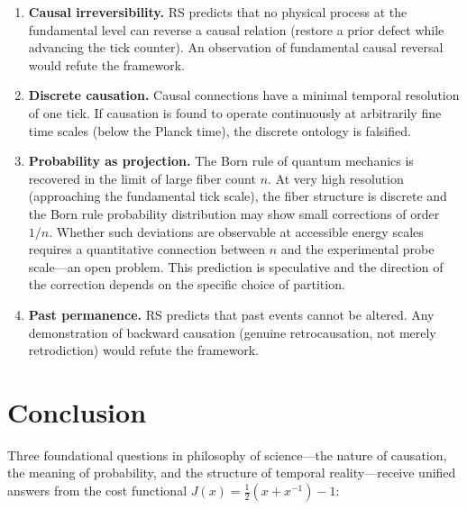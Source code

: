 \documentclass[12pt,a4paper]{article}
\theoremstyle{definition}
\theoremstyle{remark}
\begin{document}
\begin{enumerate}
  \item \textbf{Causal irreversibility.}  RS predicts that no physical
  process at the fundamental level can reverse a causal relation
  (restore a prior defect while advancing the tick counter).  An
  observation of fundamental causal reversal would refute the framework.

  \item \textbf{Discrete causation.}  Causal connections have a minimal
  temporal resolution of one tick.  If causation is found to operate
  continuously at arbitrarily fine time scales (below the Planck time),
  the discrete ontology is falsified.

  \item \textbf{Probability as projection.}  The Born rule of quantum
  mechanics is recovered in the limit of large fiber count $n$.  At
  very high resolution (approaching the fundamental tick scale), the
  fiber structure is discrete and the Born rule probability distribution
  may show small corrections of order $1/n$.  Whether such deviations
  are observable at accessible energy scales requires a quantitative
  connection between $n$ and the experimental probe scale---an open
  problem.  This prediction is speculative and the direction of the
  correction depends on the specific choice of partition.

  \item \textbf{Past permanence.}  RS predicts that past events cannot
  be altered.  Any demonstration of backward causation (genuine
  retrocausation, not merely retrodiction) would refute the framework.
\end{enumerate}

\section{Conclusion}
\label{sec:conclusion}

Three foundational questions in philosophy of science---the nature of
causation, the meaning of probability, and the structure of temporal
reality---receive unified answers from the cost functional
$J(x) = \tfrac{1}{2}(x + x^{-1}) - 1$:
\end{document}
